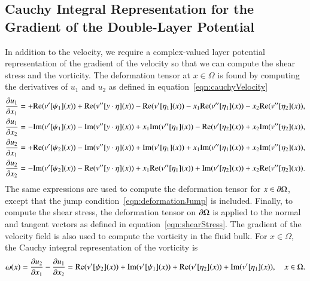 \documentclass[preprint,10pt]{elsarticle}
\begin{document}
\subsection{Cauchy Integral Representation for the Gradient of the
Double-Layer Potential}
\label{sec:gradDLPcomplex}
In addition to the velocity, we require a complex-valued layer potential representation
of the gradient of the velocity so that we can compute the shear stress
and the vorticity.  The deformation tensor at $x \in \Omega$ is found by
computing the derivatives of $u_1$ and $u_2$ as defined in
equation~\eqref{eqn:cauchyVelocity}  
\begin{equation}
\label{eqn:cauchyGradient}
  \begin{aligned}
    \frac{\partial u_1}{\partial x_1} &= +{\operatorname{Re}} (v'[\psi_1](x)) + 
      {\operatorname{Re}} (v''[y\cdot\eta](x)) - {\operatorname{Re}} (v'[\eta_1](x)) - 
      x_1{\operatorname{Re}} (v''[\eta_1](x)) - x_2{\operatorname{Re}} (v''[\eta_2](x)), \\
    \frac{\partial u_1}{\partial x_2} &= - {\operatorname{Im}} (v'[\psi_1](x)) - 
      {\operatorname{Im}} (v''[y\cdot\eta](x)) + x_1{\operatorname{Im}} (v''[\eta_1](x)) - 
      {\operatorname{Re}} (v'[\eta_2](x)) + x_2{\operatorname{Im}} (v''[\eta_2](x)), \\
    \frac{\partial u_2}{\partial x_1} &= +{\operatorname{Re}} (v'[\psi_2](x)) - 
      {\operatorname{Im}} (v''[y\cdot\eta](x)) + {\operatorname{Im}} (v'[\eta_1](x)) +
      x_1{\operatorname{Im}} (v''[\eta_1](x)) + x_2{\operatorname{Im}} (v''[\eta_2](x)), \\
    \frac{\partial u_2}{\partial x_2} &= -{\operatorname{Im}} (v'[\psi_2](x)) - 
      {\operatorname{Re}} (v''[y\cdot\eta](x)) + x_1{\operatorname{Re}} (v''[\eta_1](x)) +
      {\operatorname{Im}} (v'[\eta_2](x)) + x_2{\operatorname{Re}} (v''[\eta_2](x)).
  \end{aligned}
\end{equation}
The same expressions are used to compute the deformation tensor for $x
\in {\partial}\Omega$, except that the jump
condition~\eqref{eqn:deformationJump} is included.  Finally, to compute
the shear stress, the deformation tensor on ${\partial}\Omega$ is applied to
the normal and tangent vectors as defined in
equation~\eqref{eqn:shearStress}.  The gradient of the velocity field is
also used to compute the vorticity in the fluid bulk.  For $x \in
\Omega$, the Cauchy integral representation of the vorticity is
\begin{align}
  \omega(x) = \frac{\partial u_2}{\partial x_1} - \frac{\partial u_1}{\partial x_2} = 
{\operatorname{Re}} (v'[\psi_2](x)) + {\operatorname{Im}} (v'[\psi_1](x)) 
 + {\operatorname{Re}} (v'[\eta_2](x))+ {\operatorname{Im}} (v'[\eta_1](x)), \quad x \in \Omega.
\end{align}


\end{document}
